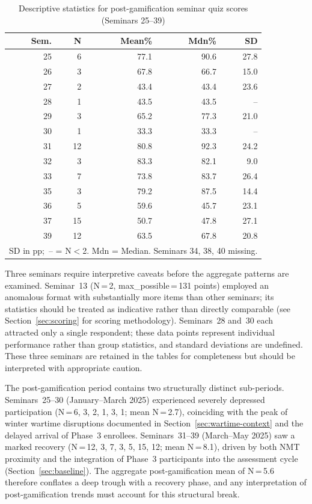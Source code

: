 \begin{table}[!h]
\centering
\caption{Descriptive statistics for post-gamification seminar quiz scores (Seminars 25--39)}
\label{tab:seminar-stats-post}
\small
\begin{tabular}{rrrrr}
\hline
\textbf{Sem.} & \textbf{N} & \textbf{Mean\%} & \textbf{Mdn\%} & \textbf{SD} \\
\hline
25 & 6  & 77.1 & 90.6 & 27.8 \\
26 & 3  & 67.8 & 66.7 & 15.0 \\
27 & 2  & 43.4 & 43.4 & 23.6 \\
28 & 1  & 43.5 & 43.5 &~-- \\
29 & 3  & 65.2 & 77.3 & 21.0 \\
30 & 1  & 33.3 & 33.3 &~-- \\
31 & 12 & 80.8 & 92.3 & 24.2 \\
32 & 3  & 83.3 & 82.1 & 9.0 \\
33 & 7  & 73.8 & 83.7 & 26.4 \\
35 & 3  & 79.2 & 87.5 & 14.4 \\
36 & 5  & 59.6 & 45.7 & 23.1 \\
37 & 15 & 50.7 & 47.8 & 27.1 \\
39 & 12 & 63.5 & 67.8 & 20.8 \\
\hline
\multicolumn{5}{l}{\footnotesize SD in pp;~-- = N$<$2. Mdn = Median. Seminars 34, 38, 40 missing.}
\end{tabular}
\end{table}

Three seminars require interpretive caveats before the aggregate patterns are examined. Seminar~13 (N\,=\,2, max\_possible\,=\,131 points) employed an anomalous format with substantially more items than other seminars; its statistics should be treated as indicative rather than directly comparable (see Section~\ref{sec:scoring} for scoring methodology). Seminars~28 and~30 each attracted only a single respondent; these data points represent individual performance rather than group statistics, and standard deviations are undefined. These three seminars are retained in the tables for completeness but should be interpreted with appropriate caution.

The post-gamification period contains two structurally distinct sub-periods. Seminars~25--30 (January--March 2025) experienced severely depressed participation (N\,=\,6, 3, 2, 1, 3, 1; mean N\,=\,2.7), coinciding with the peak of winter wartime disruptions documented in Section~\ref{sec:wartime-context} and the delayed arrival of Phase~3 enrollees. Seminars~31--39 (March--May 2025) saw a marked recovery (N\,=\,12, 3, 7, 3, 5, 15, 12; mean N\,=\,8.1), driven by both NMT proximity and the integration of Phase~3 participants into the assessment cycle (Section~\ref{sec:baseline}). The aggregate post-gamification mean of N\,=\,5.6 therefore conflates a deep trough with a recovery phase, and any interpretation of post-gamification trends must account for this structural break.


